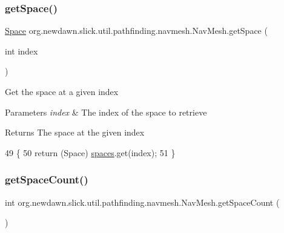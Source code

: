 \subsubsection{\texorpdfstring{get\+Space()}{getSpace()}}
{\footnotesize\ttfamily \mbox{\hyperlink{classorg_1_1newdawn_1_1slick_1_1util_1_1pathfinding_1_1navmesh_1_1_space}{Space}} org.\+newdawn.\+slick.\+util.\+pathfinding.\+navmesh.\+Nav\+Mesh.\+get\+Space (\begin{DoxyParamCaption}\item[{int}]{index }\end{DoxyParamCaption})\hspace{0.3cm}{\ttfamily [inline]}}

Get the space at a given index


\begin{DoxyParams}{Parameters}
{\em index} & The index of the space to retrieve \\
\hline
\end{DoxyParams}
\begin{DoxyReturn}{Returns}
The space at the given index 
\end{DoxyReturn}

\begin{DoxyCode}
49                                      \{
50         \textcolor{keywordflow}{return} (Space) \mbox{\hyperlink{classorg_1_1newdawn_1_1slick_1_1util_1_1pathfinding_1_1navmesh_1_1_nav_mesh_a753a5f03305449a3c61d01a41c2fb129}{spaces}}.get(index);
51     \}
\end{DoxyCode}
\mbox{\label{classorg_1_1newdawn_1_1slick_1_1util_1_1pathfinding_1_1navmesh_1_1_nav_mesh_abbd3c88a9f491f55a6af41485c359212}} 
\subsubsection{\texorpdfstring{get\+Space\+Count()}{getSpaceCount()}}
{\footnotesize\ttfamily int org.\+newdawn.\+slick.\+util.\+pathfinding.\+navmesh.\+Nav\+Mesh.\+get\+Space\+Count (\begin{DoxyParamCaption}{ }\end{DoxyParamCaption})\hspace{0.3cm}{\ttfamily [inline]}}

